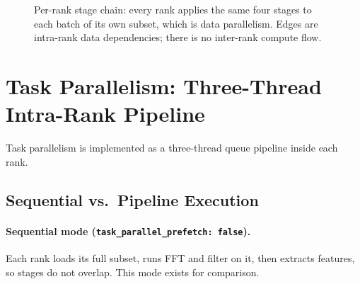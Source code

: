 \documentclass[a4paper,12pt]{report}
\begin{document}
\begin{figure}[H]
\centering
{}
\caption{Per-rank stage chain: every rank applies the same four stages to each
batch of its own subset, which is data parallelism. Edges are intra-rank data
dependencies; there is no inter-rank compute flow.}
\label{fig:per-rank-stage-chain}
\end{figure}

\section{Task Parallelism: Three-Thread Intra-Rank Pipeline}
\label{sec:prefetch-task-parallelism}

Task parallelism is implemented as a three-thread queue pipeline inside each
rank.

\subsection{Sequential vs.\ Pipeline Execution}

\paragraph{Sequential mode (\texttt{task\_\discretionary{}{}{}parallel\_\discretionary{}{}{}prefetch: false}).}
Each rank loads its full subset, runs FFT and filter on it, then extracts
features, so stages do not overlap. This mode exists for comparison.
\end{document}
